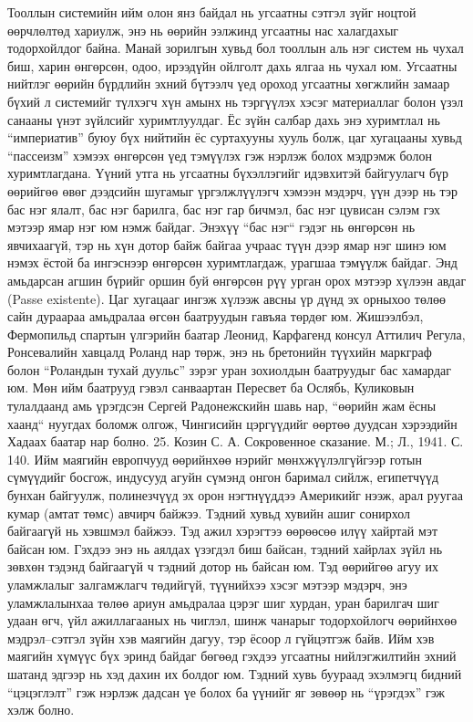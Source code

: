 Тооллын системийн ийм олон янз байдал нь угсаатны сэтгэл зүйг ноцтой өөрчлөлтөд хариулж, энэ нь өөрийн ээлжинд угсаатны нас халагдахыг тодорхойлдог байна. Манай зорилгын хувьд бол тооллын аль нэг систем нь чухал биш, харин өнгөрсөн, одоо, ирээдүйн ойлголт дахь ялгаа нь чухал юм.
Угсаатны нийтлэг өөрийн бүрдлийн эхний бүтээлч үед ороход угсаатны хөгжлийн замаар бүхий л системийг түлхэгч хүн амынх нь тэргүүлэх хэсэг материаллаг болон үзэл санааны үнэт зүйлсийг хуримтлуулдаг. Ёс зүйн салбар дахь энэ хуримтлал нь “империатив” буюу бүх нийтийн ёс суртахууны хууль болж, цаг хугацааны хувьд “пассеизм” хэмээх өнгөрсөн үед тэмүүлэх гэж нэрлэж болох мэдрэмж болон хуримтлагдана. Үүний утга нь угсаатны бүхэллэгийг идэвхитэй байгуулагч бүр өөрийгөө өвөг дээдсийн шугамыг үргэлжлүүлэгч хэмээн мэдэрч, үүн дээр нь тэр бас нэг ялалт, бас нэг барилга, бас нэг гар бичмэл, бас нэг цувисан сэлэм гэх мэтээр ямар нэг юм нэмж байдаг. Энэхүү “бас нэг“ гэдэг нь өнгөрсөн нь явчихаагүй, тэр нь хүн дотор байж байгаа учраас түүн дээр ямар нэг шинэ юм нэмэх ёстой ба ингэснээр өнгөрсөн хуримтлагдаж, урагшаа тэмүүлж байдаг. Энд амьдарсан агшин бүрийг оршин буй өнгөрсөн рүү урган орох мэтээр хүлээн авдаг (Passe existente).
Цаг хугацааг ингэж хүлээж авсны үр дүнд эх орныхоо төлөө сайн дураараа амьдралаа өгсөн баатруудын гавъяа төрдөг юм. Жишээлбэл, Фермопильд спартын үлгэрийн баатар Леонид, Карфагенд консул Аттилич Регула, Ронсевалийн хавцалд Роланд нар төрж, энэ нь бретонийн түүхийн маркграф болон “Роландын тухай дуульс” зэрэг уран зохиолдын баатруудыг бас хамардаг юм. Мөн ийм баатрууд гэвэл санваартан Пересвет ба Ослябь, Куликовын тулалдаанд амь үрэгдсэн Сергей Радонежскийн шавь нар, “өөрийн жам ёсны хаанд“ нуугдах боломж олгож, Чингисийн цэргүүдийг өөртөө дуудсан хэрээдийн Хадаах баатар нар болно. 25. Козин С. А. Сокровенное сказание. М.; Л., 1941. С. 140.
Ийм маягийн европчууд өөрийнхөө нэрийг мөнхжүүлэлгүйгээр готын сүмүүдийг босгож, индусууд агуйн сүмэнд онгон баримал сийлж, египетчүүд бунхан байгуулж, полинезчүүд эх орон нэгтнүүддээ Америкийг нээж, арал руугаа кумар (амтат төмс) авчирч байжээ. Тэдний хувьд хувийн ашиг сонирхол байгаагүй нь хэвшмэл байжээ. Тэд ажил хэрэгтээ өөрөөсөө илүү хайртай мэт байсан юм. Гэхдээ энэ нь аялдах үзэгдэл биш байсан, тэдний хайрлах зүйл нь зөвхөн тэдэнд байгаагүй ч тэдний дотор нь байсан юм. Тэд өөрийгөө агуу их уламжлалыг залгамжлагч төдийгүй, түүнийхээ хэсэг мэтээр мэдэрч, энэ уламжлалынхаа төлөө ариун амьдралаа цэрэг шиг хурдан, уран барилгач шиг удаан өгч, үйл ажиллагааных нь чиглэл, шинж чанарыг тодорхойлогч өөрийнхөө мэдрэл–сэтгэл зүйн хэв маягийн дагуу, тэр ёсоор л гүйцэтгэж байв. Ийм хэв маягийн хүмүүс бүх эринд байдаг бөгөөд гэхдээ угсаатны нийлэгжилтийн эхний шатанд эдгээр нь хэд дахин их болдог юм. Тэдний хувь буураад эхэлмэгц бидний “цэцэглэлт” гэж нэрлэж дадсан үе болох ба үүнийг яг зөвөөр нь “үрэгдэх” гэж хэлж болно.
